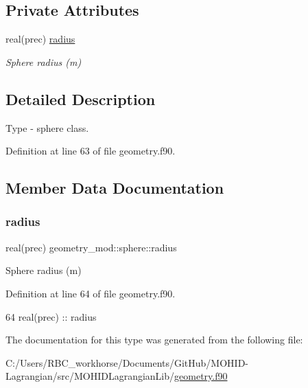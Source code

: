 \subsection*{Private Attributes}
\begin{DoxyCompactItemize}
\item 
real(prec) \mbox{\hyperlink{structgeometry__mod_1_1sphere_aea9381f351c3670047fb7a779ef44fd7}{radius}}
\begin{DoxyCompactList}\small\item\em Sphere radius (m) \end{DoxyCompactList}\end{DoxyCompactItemize}


\subsection{Detailed Description}
Type -\/ sphere class. 

Definition at line 63 of file geometry.\+f90.



\subsection{Member Data Documentation}
\mbox{\label{structgeometry__mod_1_1sphere_aea9381f351c3670047fb7a779ef44fd7}} 
\subsubsection{\texorpdfstring{radius}{radius}}
{\footnotesize\ttfamily real(prec) geometry\+\_\+mod\+::sphere\+::radius\hspace{0.3cm}{\ttfamily [private]}}



Sphere radius (m) 



Definition at line 64 of file geometry.\+f90.


\begin{DoxyCode}
64         \textcolor{keywordtype}{real(prec)} :: radius
\end{DoxyCode}


The documentation for this type was generated from the following file\+:\begin{DoxyCompactItemize}
\item 
C\+:/\+Users/\+R\+B\+C\+\_\+workhorse/\+Documents/\+Git\+Hub/\+M\+O\+H\+I\+D-\/\+Lagrangian/src/\+M\+O\+H\+I\+D\+Lagrangian\+Lib/\mbox{\hyperlink{geometry_8f90}{geometry.\+f90}}\end{DoxyCompactItemize}
